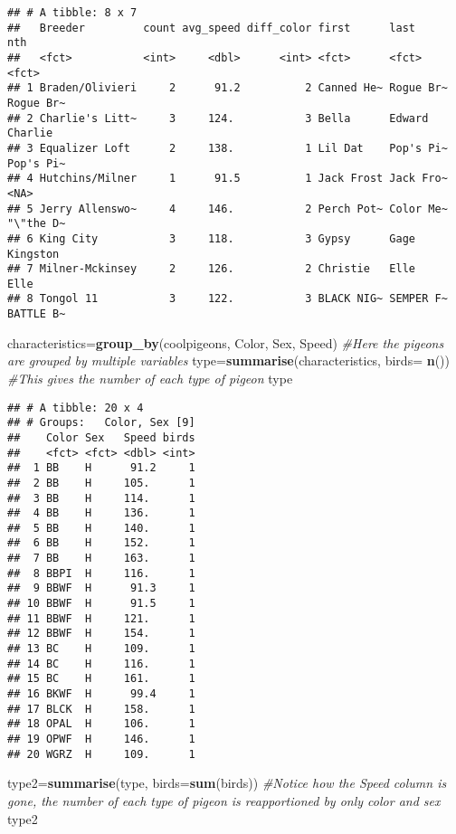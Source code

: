 \documentclass[]{article}
\newenvironment{Shaded}{\begin{snugshade}}{\end{snugshade}}
\newcommand{\KeywordTok}[1]{\textcolor[rgb]{0.13,0.29,0.53}{\textbf{#1}}}
\newcommand{\DataTypeTok}[1]{\textcolor[rgb]{0.13,0.29,0.53}{#1}}
\newcommand{\CommentTok}[1]{\textcolor[rgb]{0.56,0.35,0.01}{\textit{#1}}}
\newcommand{\NormalTok}[1]{#1}
\begin{document}
\begin{verbatim}
## # A tibble: 8 x 7
##   Breeder         count avg_speed diff_color first      last      nth      
##   <fct>           <int>     <dbl>      <int> <fct>      <fct>     <fct>    
## 1 Braden/Olivieri     2      91.2          2 Canned He~ Rogue Br~ Rogue Br~
## 2 Charlie's Litt~     3     124.           3 Bella      Edward    Charlie  
## 3 Equalizer Loft      2     138.           1 Lil Dat    Pop's Pi~ Pop's Pi~
## 4 Hutchins/Milner     1      91.5          1 Jack Frost Jack Fro~ <NA>     
## 5 Jerry Allenswo~     4     146.           2 Perch Pot~ Color Me~ "\"the D~
## 6 King City           3     118.           3 Gypsy      Gage      Kingston 
## 7 Milner-Mckinsey     2     126.           2 Christie   Elle      Elle     
## 8 Tongol 11           3     122.           3 BLACK NIG~ SEMPER F~ BATTLE B~
\end{verbatim}

\begin{Shaded}
\begin{Highlighting}[]
\NormalTok{characteristics=}\KeywordTok{group_by}\NormalTok{(coolpigeons, Color, Sex, Speed) }\CommentTok{#Here the pigeons are grouped by multiple variables}
\NormalTok{type=}\KeywordTok{summarise}\NormalTok{(characteristics, }\DataTypeTok{birds=} \KeywordTok{n}\NormalTok{()) }\CommentTok{#This gives the number of each type of pigeon}
\NormalTok{type}
\end{Highlighting}
\end{Shaded}

\begin{verbatim}
## # A tibble: 20 x 4
## # Groups:   Color, Sex [9]
##    Color Sex   Speed birds
##    <fct> <fct> <dbl> <int>
##  1 BB    H      91.2     1
##  2 BB    H     105.      1
##  3 BB    H     114.      1
##  4 BB    H     136.      1
##  5 BB    H     140.      1
##  6 BB    H     152.      1
##  7 BB    H     163.      1
##  8 BBPI  H     116.      1
##  9 BBWF  H      91.3     1
## 10 BBWF  H      91.5     1
## 11 BBWF  H     121.      1
## 12 BBWF  H     154.      1
## 13 BC    H     109.      1
## 14 BC    H     116.      1
## 15 BC    H     161.      1
## 16 BKWF  H      99.4     1
## 17 BLCK  H     158.      1
## 18 OPAL  H     106.      1
## 19 OPWF  H     146.      1
## 20 WGRZ  H     109.      1
\end{verbatim}

\begin{Shaded}
\begin{Highlighting}[]
\NormalTok{type2=}\KeywordTok{summarise}\NormalTok{(type, }\DataTypeTok{birds=}\KeywordTok{sum}\NormalTok{(birds)) }\CommentTok{#Notice how the Speed column is gone, the number of each type of pigeon is reapportioned by only color and sex}
\NormalTok{type2}
\end{Highlighting}
\end{Shaded}
\end{document}
